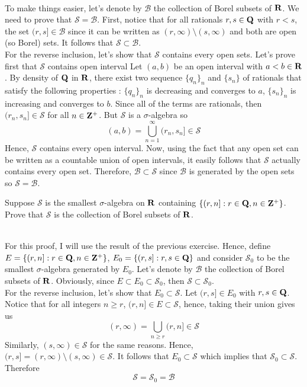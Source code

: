 \begin{solution}
    \\ To make things easier, let's denote by $\mathcal{B}$ the collection of Borel subsets of $\mathbf{R}$. We need to prove that $\mathcal{S} = \mathcal{B}$. First, notice that for all rationals $r,s\in\mathbf{Q}$ with $r < s$, the set $(r, s] \in \mathcal{B}$ since it can be written as $(r, \infty) \setminus (s, \infty)$ and both are open (so Borel) sets. It follows that $\mathcal{S} \subset \mathcal{B}$.\\
    For the reverse inclusion, let's show that $\mathcal{S}$ contains every open sets. Let's prove first that $\mathcal{S}$ contains open interval Let $(a, b)$ be an open interval with $a < b \in \mathbf{R}$. By density of $\mathbf{Q}$ in $\mathbf{R}$, there exist two sequence $\{q_n\}_n$ and $\{s_n\}$ of rationals that satisfy the following properties : $\{q_n\}_n$ is decreasing and converges to $a$, $\{s_n\}_n$ is increasing and converges to $b$. Since all of the terms are rationals, then $(r_n, s_n] \in \mathcal{S}$ for all $n\in \mathbf{Z}^+$. But $\mathcal{S}$ is a $\sigma$-algebra so 
    $$(a,b) = \bigcup_{n=1}^{\infty}(r_n, s_n] \in \mathcal{S}$$
    Hence, $\mathcal{S}$ contains every open interval. Now, using the fact that any open set can be written as a countable union of open intervals, it easily follows that $\mathcal{S}$ actually contains every open set. Therefore, $\mathcal{B} \subset \mathcal{S}$ since $\mathcal{B}$ is generated by the open sets so $\mathcal{S} = \mathcal{B}$.\\
\end{solution}

\begin{exercise}
    Suppose $\mathcal{S}$ is the smallest $\sigma$-algebra on $\mathbf{R}$ containing $\{(r, n]:r\in\mathbf{Q}, n\in\mathbf{Z}^+\}$. Prove that $\mathcal{S}$ is the collection of Borel subsets of $\mathbf{R}$. \\
\end{exercise}

\begin{solution}
    \\ For this proof, I will use the result of the previous exercise. Hence, define $E = \{(r, n]:r\in\mathbf{Q}, n\in\mathbf{Z}^+\}$, $E_0 = \{(r, s]:r,s\in\mathbf{Q}\}$ and consider $\mathcal{S}_0$ to be the smallest $\sigma$-algebra generated by $E_0$. Let's denote by $\mathcal{B}$ the collection of Borel subsets of $\mathbf{R}$. Obviously, since $E \subset E_0 \subset \mathcal{S}_0$, then $\mathcal{S} \subset \mathcal{S}_0$. \\
    For the reverse inclusion, let's show that $E_0 \subset \mathcal{S}$. Let $(r, s] \in E_0$ with $r,s \in \mathbf{Q}$. Notice that for all integers $n \geq r$, $(r, n] \in E \subset \mathcal{S}$, hence, taking their union gives us
    $$(r, \infty) = \bigcup_{n \geq r}(r, n] \in \mathcal{S}$$
    Similarly, $(s, \infty) \in \mathcal{S}$ for the same reasons. Hence, $(r, s] = (r, \infty) \setminus (s, \infty) \in \mathcal{S}$. It follows that $E_0 \subset \mathcal{S}$ which implies that $\mathcal{S}_0 \subset \mathcal{S}$. Therefore
    $$\mathcal{S} = \mathcal{S}_0 = \mathcal{B}$$\\
\end{solution}

